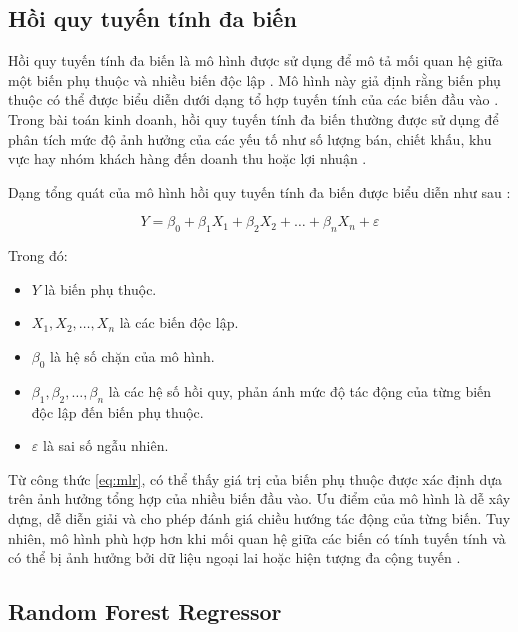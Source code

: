 \subsection*{\thesubsection\quad Hồi quy tuyến tính đa biến}

Hồi quy tuyến tính đa biến là mô hình được sử dụng để mô tả mối quan hệ giữa một biến phụ thuộc và nhiều biến độc lập \cite{sklearn_linear,islr}. Mô hình này giả định rằng biến phụ thuộc có thể được biểu diễn dưới dạng tổ hợp tuyến tính của các biến đầu vào \cite{sklearn_linear}. Trong bài toán kinh doanh, hồi quy tuyến tính đa biến thường được sử dụng để phân tích mức độ ảnh hưởng của các yếu tố như số lượng bán, chiết khấu, khu vực hay nhóm khách hàng đến doanh thu hoặc lợi nhuận \cite{islr}.

Dạng tổng quát của mô hình hồi quy tuyến tính đa biến được biểu diễn như sau \cite{sklearn_linear}:

\begin{equation}
Y = \beta_0 + \beta_1 X_1 + \beta_2 X_2 + \dots + \beta_n X_n + \varepsilon
\label{eq:mlr}
\end{equation}

Trong đó:
\begin{itemize}
    \item \(Y\) là biến phụ thuộc.
    \item \(X_1, X_2, \dots, X_n\) là các biến độc lập.
    \item \(\beta_0\) là hệ số chặn của mô hình.
    \item \(\beta_1, \beta_2, \dots, \beta_n\) là các hệ số hồi quy, phản ánh mức độ tác động của từng biến độc lập đến biến phụ thuộc.
    \item \(\varepsilon\) là sai số ngẫu nhiên.
\end{itemize}

Từ công thức \eqref{eq:mlr}, có thể thấy giá trị của biến phụ thuộc được xác định dựa trên ảnh hưởng tổng hợp của nhiều biến đầu vào. Ưu điểm của mô hình là dễ xây dựng, dễ diễn giải và cho phép đánh giá chiều hướng tác động của từng biến. Tuy nhiên, mô hình phù hợp hơn khi mối quan hệ giữa các biến có tính tuyến tính và có thể bị ảnh hưởng bởi dữ liệu ngoại lai hoặc hiện tượng đa cộng tuyến \cite{islr,esl}.

\subsection*{\thesubsection\quad Random Forest Regressor}


